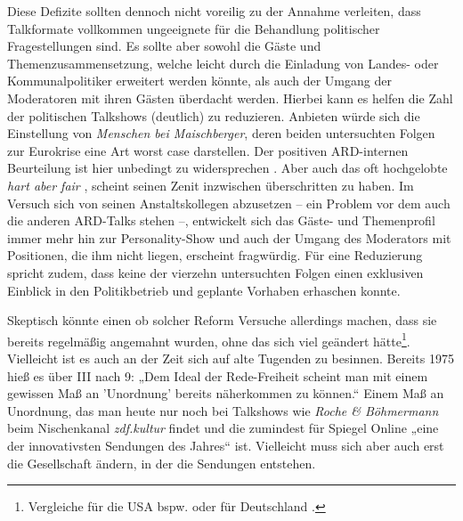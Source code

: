 Diese Defizite sollten dennoch nicht voreilig zu der Annahme verleiten, dass Talkformate vollkommen ungeeignete für die Behandlung politischer Fragestellungen sind. Es sollte aber sowohl die Gäste und Themenzusammensetzung, welche leicht durch die Einladung von Landes- oder Kommunalpolitiker erweitert werden könnte, als auch der Umgang der Moderatoren mit ihren Gästen überdacht werden. Hierbei kann es helfen die Zahl der politischen Talkshows (deutlich) zu reduzieren. Anbieten würde sich die Einstellung von \textit{Menschen bei Maischberger}, deren beiden untersuchten Folgen zur Eurokrise eine Art worst case darstellen. Der positiven ARD-internen Beurteilung ist hier unbedingt zu widersprechen \parencite[7]{ard-programmbeiratTalkformateImErsten2012}. Aber auch das oft hochgelobte \textit{hart aber fair} \parencites[7]{ard-programmbeiratTalkformateImErsten2012}[102ff.; vgl. Kapitel \vref{chap:hartaberfair}]{eisentrautPolitTalkAlsForm2007}, scheint seinen Zenit inzwischen überschritten zu haben. Im Versuch sich von seinen Anstaltskollegen abzusetzen – ein Problem vor dem auch die anderen ARD-Talks stehen –, entwickelt sich das Gäste- und Themenprofil immer mehr hin zur Personality-Show und auch der Umgang des Moderators mit Positionen, die ihm nicht liegen, erscheint fragwürdig. Für eine Reduzierung spricht zudem, dass keine der vierzehn untersuchten Folgen einen exklusiven Einblick in den Politikbetrieb und geplante Vorhaben erhaschen konnte.

Skeptisch könnte einen ob solcher Reform Versuche allerdings machen, dass sie bereits regelmäßig angemahnt wurden, ohne das sich viel geändert hätte\footnote{Vergleiche für die USA bspw. \textcite{nixMeetPressGame1974} oder für Deutschland \textcites[17f.]{muellerSchaubuehneFuerEinflussreichen2006}[117]{gaeblerUndUnserenTaeglichen2011}.}. Vielleicht ist es auch an der Zeit sich auf alte Tugenden zu besinnen. Bereits 1975 hieß es über III nach 9: „Dem Ideal der Rede-Freiheit scheint man mit einem gewissen Maß an 'Unordnung' bereits näherkommen zu können.“ Einem Maß an Unordnung, das man heute nur noch bei Talkshows wie \textit{Roche \& Böhmermann} beim Nischenkanal \textit{zdf.kultur} findet und die zumindest für Spiegel Online „eine der innovativsten Sendungen des Jahres“ \parencite{gitschierStudentenAlsProduzenten2012} ist. Vielleicht muss sich aber auch erst die Gesellschaft ändern, in der die Sendungen entstehen.